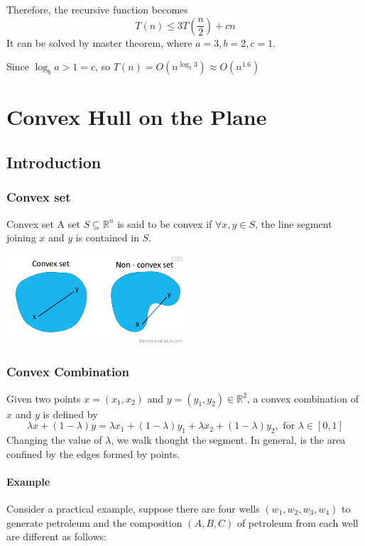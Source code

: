 \documentclass[en,hazy,blue,screen,14pt]{elegantnote}
\begin{document}
Therefore, the recursive function becomes
\[T(n) \le 3T(\frac{n}{2}) + cn\]
It can be solved by master theorem, where $a = 3, b = 2, c = 1$.

Since $\log_ba > 1 = c$, so $T(n) = O(n^{\log_2 3}) \approx O(n^{1.6})$
\section{Convex Hull on the Plane}
\subsection{Introduction}
\subsubsection{Convex set}
Convex set A set $S \subseteq \mathbb{R}^n$ is said to be convex if $\forall 
x,y \in S$, the line segment joining $x$ and $y$ is contained in $S$.

\centerline{\includegraphics[width=0.5\textwidth]{convex-nonconvex-set.png}}
\subsubsection{Convex Combination}
Given two points $x=(x_1, x_2)$ and $y = (y_1, y_2) \in \mathbb{R}^2$, a convex 
combination of $x$ and $y$ is defined by
\[\lambda x + (1 - \lambda) y = \lambda x_1 + (1 - \lambda)y_1 + \lambda x_2 + 
(1 - \lambda)y_2, \text{ for } \lambda \in [0,1]\]
Changing the value of $\lambda$, we walk thought the segment. In general, 
 is the area confined by the edges formed by points.
 
 \paragraph{Example} Consider a practical example, suppose there are four wells 
$(w_1, w_2, w_3, w_4)$ to generate petroleum and the composition $(A, B, C)$ of 
petroleum from each well are different as follows:
\end{document}
